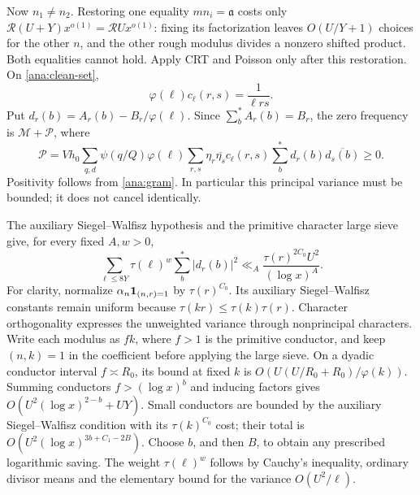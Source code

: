 Now $n_1\ne n_2$. Restoring one equality $mn_i=\mathfrak{a}$ costs only
$\mathcal R(U+Y)x^{o(1)}=\mathcal RUx^{o(1)}$: fixing its
factorization leaves $O(U/Y+1)$ choices for the other $n$, and the other
rough modulus divides a nonzero shifted product. Both equalities cannot
hold. Apply CRT and Poisson only after this restoration. On
\eqref{ana:clean-set},
\[
 \varphi(\ell)c_\ell(r,s)=\frac1{\ell rs}.
\]
Put $d_r(b)=A_r(b)-B_r/\varphi(\ell)$. Since $\sum_b^*A_r(b)=B_r$,
the zero frequency is $\mathcal M+\mathcal P$, where
\begin{equation}
 \mathcal P=Vh_0\sum_{q,d}\psi(q/Q)\varphi(\ell)
   \sum_{r,s}\eta_r\overline{\eta_s}c_\ell(r,s)
                     \sum_b^*d_r(b)\overline{d_s(b)}\ge0.
 \label{ana:principal-variance}
\end{equation}
Positivity follows from \eqref{ana:gram}. In particular this principal
variance must be bounded; it does not cancel identically.

The auxiliary Siegel--Walfisz hypothesis and the primitive character
large sieve give, for every fixed $A,w>0$,
\begin{equation}
 \sum_{\ell\le8Y}\tau(\ell)^w\sum_b^*|d_r(b)|^2
       \ll_A\frac{\tau(r)^{2C_0}U^2}{(\log x)^A}.
 \label{ana:filtered-BDH}
\end{equation}
For clarity, normalize $\alpha_n\mathbf 1_{(n,r)=1}$ by $\tau(r)^{C_0}$.
Its auxiliary Siegel--Walfisz constants remain uniform because
$\tau(kr)\le\tau(k)\tau(r)$. Character orthogonality expresses the
unweighted variance through nonprincipal characters. Write each modulus
as $fk$, where $f>1$ is the primitive conductor, and keep $(n,k)=1$
in the coefficient before applying the large sieve. On a dyadic
conductor interval $f\asymp R_0$, its bound at fixed $k$ is
$O(U(U/R_0+R_0)/\varphi(k))$. Summing conductors
$f>(\log x)^b$ and inducing factors gives
$O(U^2(\log x)^{2-b}+UY)$. Small conductors are bounded by the
auxiliary Siegel--Walfisz condition with its $\tau(k)^{C_0}$ cost;
their total is $O(U^2(\log x)^{3b+C_1-2B})$.
Choose $b$, and then $B$, to obtain any prescribed logarithmic saving.
The weight $\tau(\ell)^w$ follows by Cauchy's inequality, ordinary
divisor means and the elementary bound for the variance
$O(U^2/\ell)$.

